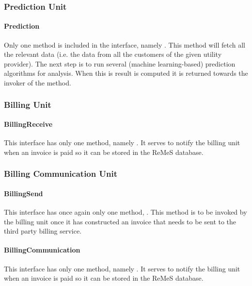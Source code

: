 \subsubsection{Prediction Unit}

\paragraph{Prediction}

\npar Only one method is included in the  interface,
namely . This method will
fetch all the relevant data (i.e. the data from all the customers of the given
utility provider). The next step is to run several (machine learning-based)
prediction algorithms for analysis. When this is result is computed it is
returned towards the invoker of the method.

\subsubsection{Billing Unit}

\paragraph{BillingReceive}

\npar This interface has only one method, namely . It
serves to notify the billing unit when an invoice is paid so it can be stored in
the ReMeS database.

\subsubsection{Billing Communication Unit}

\paragraph{BillingSend}

\npar This interface has once again only one method, .
This method is to be invoked by the billing unit once it has constructed an
invoice that needs to be sent to the third party billing service.

\paragraph{BillingCommunication}
\npar This interface has only one method, namely . It
serves to notify the billing unit when an invoice is paid so it can be stored in
the ReMeS database.

